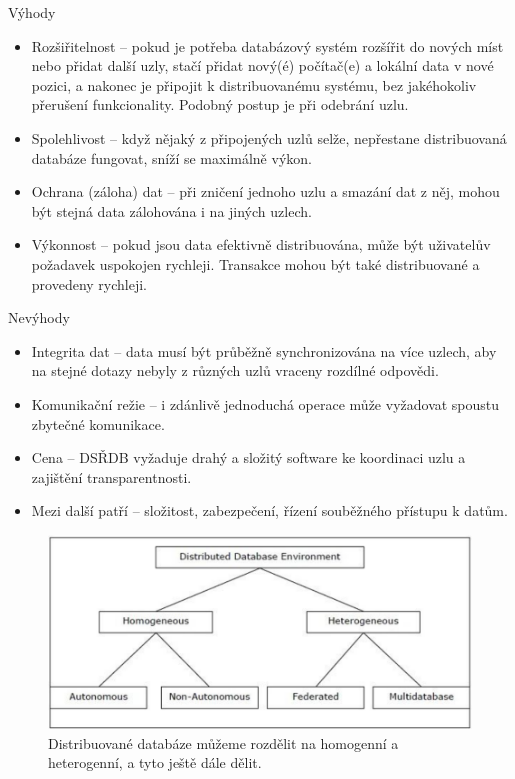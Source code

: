 Výhody
\begin{itemize}
\item Rozšiřitelnost – pokud je potřeba databázový systém rozšířit do nových míst nebo přidat další uzly, stačí přidat nový(é) počítač(e) a lokální data v nové pozici, a nakonec je připojit k distribuovanému systému, bez jakéhokoliv přerušení funkcionality. Podobný postup je při odebrání uzlu.

\item Spolehlivost – když nějaký z připojených uzlů selže, nepřestane distribuovaná databáze fungovat, sníží se maximálně výkon.

\item Ochrana (záloha) dat – při zničení jednoho uzlu a smazání dat z něj, mohou být stejná data zálohována i na jiných uzlech.

\item Výkonnost – pokud jsou data efektivně distribuována, může být uživatelův požadavek uspokojen rychleji. Transakce mohou být také distribuované a provedeny rychleji. 
\end{itemize}

Nevýhody
\begin{itemize}
\item Integrita dat – data musí být průběžně synchronizována na více uzlech, aby na stejné dotazy nebyly z různých uzlů vraceny rozdílné odpovědi.

\item Komunikační režie – i zdánlivě jednoduchá operace může vyžadovat spoustu zbytečné komunikace.

\item Cena – DSŘDB vyžaduje drahý a složitý software ke koordinaci uzlu a zajištění transparentnosti. \cite{distributedDBMS}

\item Mezi další patří – složitost, zabezpečení, řízení souběžného přístupu k datům.
\end{itemize}

\begin{figure}[!h]
  \centering
  \includegraphics[width=15cm]{template-fig/distributed_database_environments.pdf}
  \caption{Distribuované databáze můžeme rozdělit na homogenní a heterogenní, a tyto ještě dále dělit. \cite{distributedDBMS}}
  \label{FIG_DivDistrDB}
\end{figure}

